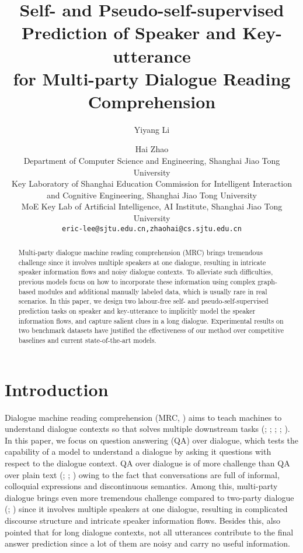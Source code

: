 \documentclass[11pt]{article}
\title{Self- and Pseudo-self-supervised Prediction of Speaker and Key-utterance\\ for Multi-party Dialogue Reading Comprehension}
\author{Yiyang Li \and Hai Zhao \\
	 Department of Computer Science and Engineering, Shanghai Jiao Tong University\\
	 Key Laboratory of Shanghai Education Commission for Intelligent Interaction\\and Cognitive Engineering, Shanghai Jiao Tong University\\
	 MoE Key Lab of Artificial Intelligence, AI Institute, Shanghai Jiao Tong University\\
	\texttt{eric-lee@sjtu.edu.cn,zhaohai@cs.sjtu.edu.cn}
}
\begin{document}
	\maketitle
	\begin{abstract}
		Multi-party dialogue machine reading comprehension (MRC) brings tremendous challenge since it involves multiple speakers at one dialogue, resulting in intricate speaker information flows and noisy dialogue contexts. To alleviate such difficulties, previous models focus on how to incorporate these information using complex graph-based modules and additional manually labeled data, which is usually rare in real scenarios. In this paper, we design two labour-free self- and pseudo-self-supervised prediction tasks on speaker and key-utterance to implicitly model the speaker information flows, and capture salient clues in a long dialogue. Experimental results on two benchmark datasets have justified the effectiveness of our method over competitive baselines and current state-of-the-art models.
	\end{abstract}
	
	\let\thefootnote\relax{}
	
	\section{Introduction}
	Dialogue machine reading comprehension (MRC, \citealp{hermann2015teaching}) aims to teach machines to understand dialogue contexts so that solves multiple downstream tasks (\citealp{yang2019friendsqa}; \citealp{li2020molweni}; \citealp{lowe2015ubuntu}; \citealp{wu2017sequential}; \citealp{zhang2018modeling}). In this paper, we focus on question answering (QA) over dialogue, which tests the capability of a model to understand a dialogue by asking it questions with respect to the dialogue context. QA over dialogue is of more challenge than QA over plain text (\citealp{rajpurkar2016squad}; \citealp{reddy2019coqa}; \citealp{yang2019friendsqa}) owing to the fact that conversations are full of informal, colloquial expressions and discontinuous semantics. Among this, multi-party dialogue brings even more tremendous challenge compared to two-party dialogue (\citealp{sun2019dream}; \citealp{cui2020mutual}) since it involves multiple speakers at one dialogue, resulting in complicated discourse structure \citep{li2020molweni} and intricate speaker information flows. Besides this, \citet{zhang2021multi} also pointed that for long dialogue contexts, not all utterances contribute to the final answer prediction since a lot of them are noisy and carry no useful information.
	
\end{document}
